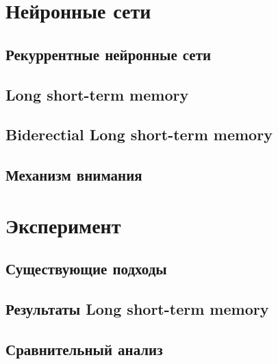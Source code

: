 \section{Нейронные сети}\label{ner_network}
    \subsection{Рекуррентные нейронные сети}
    \subsection{Long short-term memory}
    \subsection{Biderectial Long short-term memory}
    \subsection{Механизм внимания}
\clearpage

\section{Эксперимент}\label{experiment}
    \subsection{Существующие подходы}\label{be_class_exp}
    \subsection{Результаты Long short-term memory}\label{lstm_class_exp}
    \subsection{Сравнительный анализ}
\clearpage